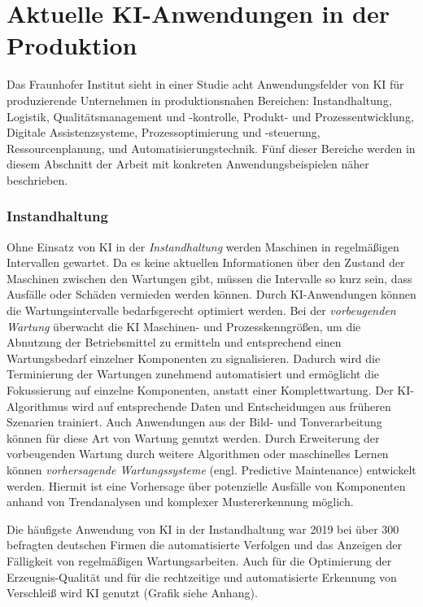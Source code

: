 \documentclass[a4paper,12pt, german]{report}
\begin{document}
\section{Aktuelle KI-Anwendungen in der Produktion}
Das Fraunhofer Institut sieht in einer Studie acht Anwendungsfelder von KI für produzierende Unternehmen in produktionsnahen Bereichen: Instandhaltung, Logistik, Qualitätsmanagement und -kontrolle, Produkt- und Prozessentwicklung, Digitale Assistenzsysteme, Prozessoptimierung und -steuerung, Ressourcenplanung, und Automatisierungstechnik.\cite{24} \newline Fünf dieser Bereiche werden in diesem Abschnitt der Arbeit mit konkreten Anwendungsbeispielen näher beschrieben.

\subsubsection{Instandhaltung}
Ohne Einsatz von KI in der \textit{Instandhaltung} werden Maschinen in regelmäßigen Intervallen gewartet. Da es keine aktuellen Informationen über den Zustand der Maschinen zwischen den Wartungen gibt, müssen die Intervalle so kurz sein, dass Ausfälle oder Schäden vermieden werden können. Durch KI-Anwendungen können die Wartungsintervalle bedarfsgerecht optimiert werden. Bei der \textit{vorbeugenden Wartung} überwacht die KI Maschinen- und Prozesskenngrößen, um die Abnutzung der Betriebsmittel zu ermitteln und entsprechend einen Wartungsbedarf einzelner Komponenten zu signalisieren. Dadurch wird die Terminierung der Wartungen zunehmend automatisiert und ermöglicht die Fokussierung auf einzelne Komponenten, anstatt einer Komplettwartung. Der KI-Algorithmus wird auf entsprechende Daten und Entscheidungen aus früheren Szenarien trainiert. Auch Anwendungen aus der Bild- und Tonverarbeitung können für diese Art von Wartung genutzt werden. Durch Erweiterung der vorbeugenden Wartung durch weitere Algorithmen oder maschinelles Lernen können \textit{vorhersagende Wartungssysteme} (engl. Predictive Maintenance) entwickelt werden. Hiermit ist eine Vorhersage über potenzielle Ausfälle von Komponenten anhand von Trendanalysen und komplexer Mustererkennung möglich.\cite{24}

Die häufigste Anwendung von KI in der Instandhaltung war 2019 bei über 300 befragten deutschen Firmen die automatisierte Verfolgen und das Anzeigen der Fälligkeit von regelmäßigen Wartungsarbeiten. Auch für die Optimierung der Erzeugnis-Qualität und für die rechtzeitige und automatisierte Erkennung von Verschleiß wird KI genutzt (Grafik siehe Anhang).\cite{29}
\end{document}
